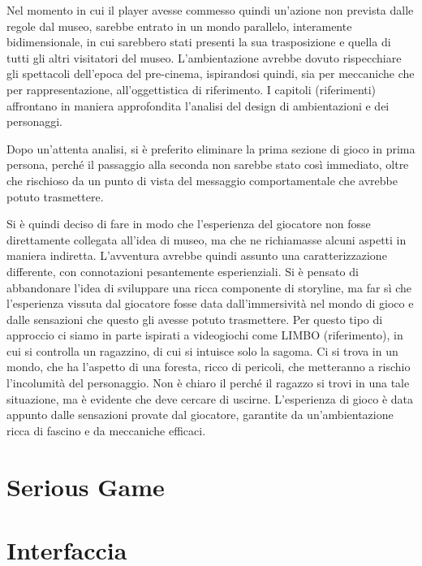 Nel momento in cui il player avesse commesso quindi un’azione non prevista dalle regole dal museo, sarebbe entrato in un mondo parallelo, interamente bidimensionale, in cui sarebbero stati presenti la sua trasposizione e quella di tutti gli altri visitatori del museo.
L’ambientazione avrebbe dovuto rispecchiare gli spettacoli dell’epoca del pre-cinema, ispirandosi quindi, sia per meccaniche che per rappresentazione, all’oggettistica di riferimento.
I capitoli (riferimenti) affrontano in maniera approfondita l’analisi del design di ambientazioni e dei personaggi.

Dopo un’attenta analisi, si è preferito eliminare la prima sezione di gioco in prima persona, perché il passaggio alla seconda non sarebbe stato così immediato, oltre che rischioso da un punto di vista del messaggio comportamentale che avrebbe potuto trasmettere.

Si è quindi deciso di fare in modo che l’esperienza del giocatore non fosse direttamente collegata all’idea di museo, ma che ne richiamasse alcuni aspetti in maniera indiretta.
L’avventura avrebbe quindi assunto una caratterizzazione differente, con connotazioni pesantemente esperienziali. Si è pensato di abbandonare l’idea di sviluppare una ricca componente di storyline, ma far sì che l’esperienza vissuta dal giocatore fosse data dall’immersività nel mondo di gioco e dalle sensazioni che questo gli avesse potuto trasmettere.
Per questo tipo di approccio ci siamo in parte ispirati a videogiochi come LIMBO (riferimento), in cui si controlla un ragazzino, di cui si intuisce solo la sagoma. Ci si trova in un mondo, che ha l’aspetto di una foresta, ricco di pericoli, che metteranno a rischio l’incolumità del personaggio. Non è chiaro il perché il ragazzo si trovi in una tale situazione, ma è evidente che deve cercare di uscirne. L’esperienza di gioco è data appunto dalle sensazioni provate dal giocatore, garantite da un’ambientazione ricca di fascino e da meccaniche efficaci.


\section{Serious Game}
\label{sec:design_serious}

\section{Interfaccia}
\label{sec:design_interfaccia}